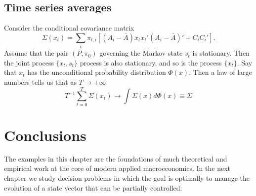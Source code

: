 %
%










\subsection{Time series averages}
Consider the conditional covariance matrix
$$\Sigma(x_t)  = \sum_i \pi_{t,i} [ (A_i - \bar A) x_t x_t' (A_i - \bar A)' + C_i C_i' ] .$$
Assume that the pair $(P, \pi_0)$ governing the  Markov state $s_t$ is stationary. Then  the joint process $\{x_t, s_t\}$ process is also  stationary,
and so is the  process $\{x_t\}$. Say that $x_t$ has  the unconditional probability distribution $\Phi(x)$.
Then a law of large numbers tells us that as $ {T \rightarrow + \infty}$
$$ T^{-1} \sum_{t=0}^T \Sigma(x_t)  \rightarrow \int \Sigma(x) d \Phi(x) \equiv \Sigma $$
















\section{Conclusions}
The examples in this chapter are the foundations of much  theoretical and empirical work
at the core of modern applied macroeconomics. 
In the
next chapter we study decision problems in which the goal is
optimally to manage the evolution of a state vector that can be
partially controlled.
%
%

